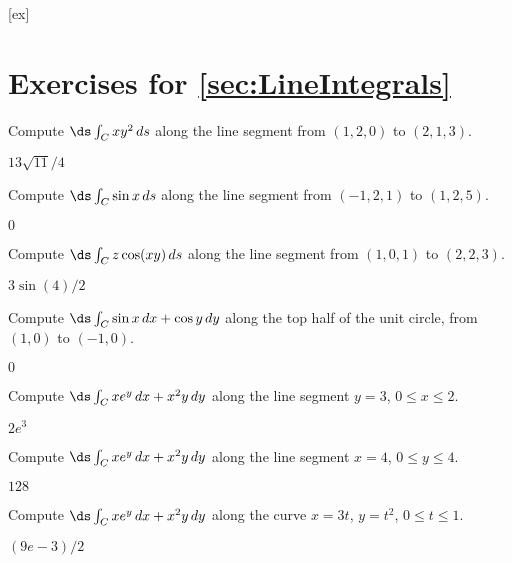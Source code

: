 [ex]
\section*{Exercises for \ref{sec:LineIntegrals}}

\begin{enumialphparenastyle}

\begin{ex}
Compute $\ds\int_C xy^2\,ds$ along the line segment from
$(1,2,0)$ to $(2,1,3)$.
\begin{sol}
	$13\sqrt{11}/4$
\end{sol}
\end{ex}

\begin{ex}
Compute $\ds\int_C \sin x\,ds$ along the line segment from
$(-1,2,1)$ to $(1,2,5)$.
\begin{sol}
	$0$
\end{sol}
\end{ex}

\begin{ex}
Compute $\ds\int_C z\cos(xy)\,ds$ along the line segment from
$(1,0,1)$ to $(2,2,3)$.
\begin{sol}
	$3\sin(4)/2$
\end{sol}
\end{ex}

\begin{ex}
Compute $\ds\int_C \sin x\,dx+\cos y\,dy$ along the top half
of the unit circle, from $(1,0)$ to $(-1,0)$.
\begin{sol}
	$0$
\end{sol}
\end{ex}

\begin{ex}
Compute $\ds\int_C xe^y\,dx+x^2y\,dy$ along the line segment
$y=3$, $0\le x\le 2$.
\begin{sol}
	$2e^3$
\end{sol}
\end{ex}

\begin{ex}
Compute $\ds\int_C xe^y\,dx+x^2y\,dy$ along the line segment
$x=4$, $0\le y\le 4$.
\begin{sol}
	$128$
\end{sol}
\end{ex}

\begin{ex}
Compute $\ds\int_C xe^y\,dx+x^2y\,dy$ along the curve
$x=3t$, $y=t^2$, $0\le t\le1$.
\begin{sol}
	$(9e-3)/2$
\end{sol}
\end{ex}


\end{enumialphparenastyle}
